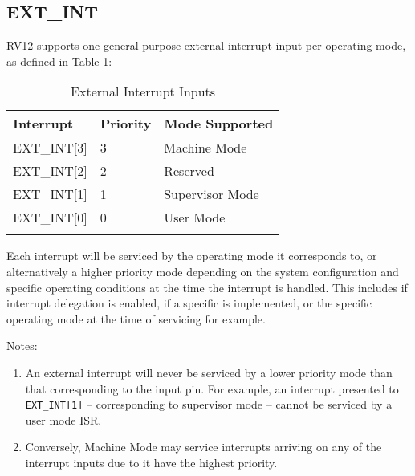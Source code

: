\subsection{EXT\_INT}\label{ext_int}

RV12 supports one general-purpose external interrupt input per operating
mode, as defined in Table \ref{tab:external-interrupt-inputs}:

\begin{longtable}[]{@{}lll@{}}
\toprule
Interrupt & Priority & Mode Supported\tabularnewline
\midrule
\endhead
EXT\_INT{[}3{]} & 3 & Machine Mode\tabularnewline
EXT\_INT{[}2{]} & 2 & Reserved\tabularnewline
EXT\_INT{[}1{]} & 1 & Supervisor Mode\tabularnewline
EXT\_INT{[}0{]} & 0 & User Mode\tabularnewline
\bottomrule
\caption{External Interrupt Inputs}
\label{tab:external-interrupt-inputs}
\end{longtable}

Each interrupt will be serviced by the operating mode it corresponds to,
or alternatively a higher priority mode depending on the system
configuration and specific operating conditions at the time the
interrupt is handled. This includes if interrupt delegation is enabled,
if a specific is implemented, or the specific operating mode at the time
of servicing for example.

Notes:

\begin{enumerate}
\def\labelenumi{\arabic{enumi}.}
\item
  An external interrupt will never be serviced by a lower priority mode
  than that corresponding to the input pin. For example, an interrupt
  presented to \texttt{EXT\_INT{[}1{]}} -- corresponding to supervisor mode --
  cannot be serviced by a user mode ISR.
\item
  Conversely, Machine Mode may service interrupts arriving on any of the
  interrupt inputs due to it have the highest priority.
\end{enumerate}